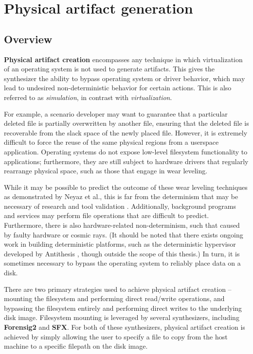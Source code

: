 \section{Physical artifact
generation}\label{physical-artifact-generation}

\subsection{Overview}\label{overview-1}

\textbf{Physical artifact creation} encompasses any technique in which
virtualization of an operating system is not used to generate artifacts.
This gives the synthesizer the ability to bypass operating system or
driver behavior, which may lead to undesired non-deterministic behavior
for certain actions. This is also referred to as \emph{simulation}, in
contrast with \emph{virtualization}.

For example, a scenario developer may want to guarantee that a
particular deleted file is partially overwritten by another file,
ensuring that the deleted file is recoverable from the slack space of
the newly placed file. However, it is extremely difficult to force the
reuse of the same physical regions from a userspace application.
Operating systems do not expose low-level filesystem functionality to
applications; furthermore, they are still subject to hardware drivers
that regularly rearrange physical space, such as those that engage in
wear leveling.

While it may be possible to predict the outcome of these wear leveling
techniques as demonstrated by Neyaz et al., this is far from the
determinism that may be necessary of research and tool validation
\cite{neyazForensicAnalysisWear2018}. Additionally, background
programs and services may perform file operations that are difficult to
predict. Furthermore, there is also hardware-related non-determinism,
such that caused by faulty hardware or cosmic rays. (It should be noted
that there exists ongoing work in building deterministic platforms, such
as the deterministic hypervisor developed by Antithesis
\cite{pshenichkinYouThinkYou2024}, though outside the scope of this
thesis.) In turn, it is sometimes necessary to bypass the operating
system to reliably place data on a disk.

There are two primary strategies used to achieve physical artifact
creation -- mounting the filesystem and performing direct read/write
operations, and bypassing the filesystem entirely and performing direct
writes to the underlying disk image. Filesystem mounting is leveraged by
several synthesizers, including \textbf{Forensig2} and \textbf{SFX}. For
both of these synthesizers, physical artifact creation is achieved by
simply allowing the user to specify a file to copy from the host machine
to a specific filepath on the disk image.

